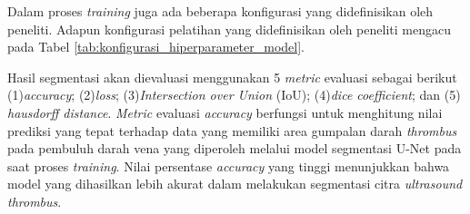 {Dalam proses \textit{training} juga ada beberapa konfigurasi yang didefinisikan oleh peneliti. Adapun konfigurasi pelatihan yang didefinisikan oleh peneliti mengacu pada Tabel \ref{tab:konfigurasi_hiperparameter_model}.


\begin{table}[htbp]
	\centering
	\caption{Konfigurasi Hiperparameter Model}
	\label{tab:konfigurasi_hiperparameter_model}
\end{table}

Hasil segmentasi akan dievaluasi menggunakan 5 \textit{metric} evaluasi sebagai berikut (1)\textit{accuracy}; (2)\textit{loss}; (3)\textit{Intersection over Union} (IoU); (4)\textit{dice coefficient}; dan (5) \textit{hausdorff distance}. \textit{Metric} evaluasi \textit{accuracy} berfungsi untuk menghitung nilai prediksi yang tepat terhadap data yang memiliki area gumpalan darah \textit{thrombus} pada pembuluh darah vena yang diperoleh melalui model segmentasi U-Net pada saat proses \textit{training}. Nilai persentase \textit{accuracy} yang tinggi menunjukkan bahwa model yang dihasilkan lebih akurat dalam melakukan segmentasi citra \textit{ultrasound} \textit{thrombus}.

}
